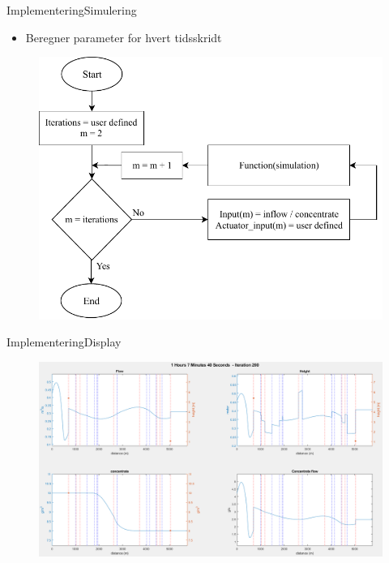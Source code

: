 \begin{frame}{Implementering}{Simulering}
\vfill \vfill \centering
    \begin{itemize}
    	\item Beregner parameter for hvert tidsskridt 
    \end{itemize}

    \begin{figure}[H]
\centering
\includegraphics[width=0.5 \textwidth]{figures/simu_main_chart.pdf}
\label{fig:simu_main_chart}
\end{figure}

\vfill \vfill
\end{frame}

\begin{frame}{Implementering}{Display}
     \begin{figure}[h]
 \centering
 \includegraphics[width=1.0 \textwidth]{figures/display_result_matlab.png}
 \label{fig:display_result_matlab}
 \end{figure}
\end{frame}


